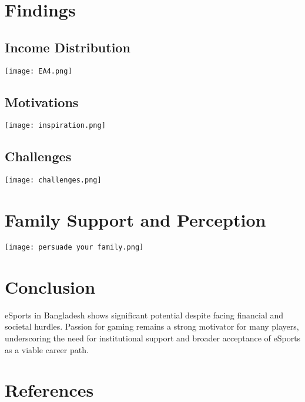 \documentclass[a0,landscape]{a0poster}
\begin{document}
\begin{multicols}{4}
\section*{Findings}

\subsection*{Income Distribution}
\texttt{[image: EA4.png]}

\subsection*{Motivations}
\texttt{[image: inspiration.png]}

\subsection*{Challenges}
\texttt{[image: challenges.png]}


\section*{Family Support and Perception}
\texttt{[image: persuade your family.png]}


\section*{Conclusion}
eSports in Bangladesh shows significant potential despite facing financial and societal hurdles. Passion for gaming remains a strong motivator for many players, underscoring the need for institutional support and broader acceptance of eSports as a viable career path.


\section*{References}



\end{multicols}
\end{document}
